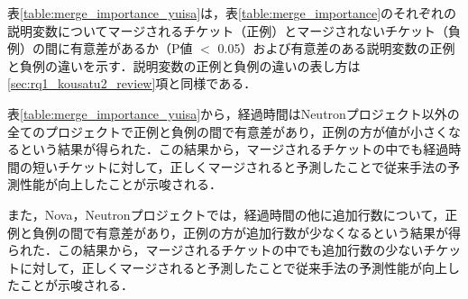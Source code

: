 \documentclass[11pt]{jreport}
\begin{document}
\begin{table}[t]
\caption{マージが開始されるチケットの予測において重要度の高い説明変数と重要度}
\label{table:merge_importance}
\centering
\vspace{0.5zh}
\end{table}


表\ref{table:merge_importance_yuisa}は，表\ref{table:merge_importance}のそれぞれの説明変数についてマージされるチケット（正例）とマージされないチケット（負例）の間に有意差があるか（P値 $<$ 0.05）および有意差のある説明変数の正例と負例の違いを示す．説明変数の正例と負例の違いの表し方は\ref{sec:rq1_kousatu2_review}項と同様である．

表\ref{table:merge_importance_yuisa}から，経過時間はNeutronプロジェクト以外の全てのプロジェクトで正例と負例の間で有意差があり，正例の方が値が小さくなるという結果が得られた．この結果から，マージされるチケットの中でも経過時間の短いチケットに対して，正しくマージされると予測したことで従来手法の予測性能が向上したことが示唆される．

また，Nova，Neutronプロジェクトでは，経過時間の他に追加行数について，正例と負例の間で有意差があり，正例の方が追加行数が少なくなるという結果が得られた．この結果から，マージされるチケットの中でも追加行数の少ないチケットに対して，正しくマージされると予測したことで従来手法の予測性能が向上したことが示唆される．
\end{document}
